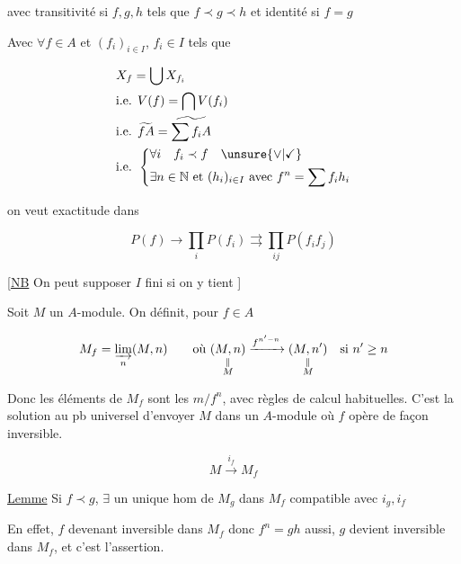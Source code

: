 avec transitivité si $f,g,h$ tels que $f\prec g\prec h$ et identité si $f=g$

Avec $\forall f\in A$ et $(f_i)_{i\in I}$, $f_i\in{I}$ tels que

\[
\begin{aligned}
&X_f=\bigcup X_{f_i}\\
&\text{i.e. }V(f)=\bigcap V(f_i)\\
&\text{i.e. }\widetilde{fA}=\widetilde{\sum f_i A}\\
&\text{i.e. }\left\{\begin{aligned}
&\forall i\quad f_i\prec f\quad\unsure{\vee|\checkmark}\\
&\exists n\in\mathbb N\text{ et }(h_i)_{i\in I}\text{ avec } f^n=\sum f_i h_i
\end{aligned}\right.
\end{aligned}
\]

on veut exactitude dans

\[
P(f)\longrightarrow\prod_i P(f_i)\rightrightarrows\prod_{ij}P(f_i f_j)
\]


[\uline{NB} On peut supposer $I$ fini si on y tient ]

Soit $M$ un $A$-module. On définit, pour $f\in A$

\[
M_f=\varinjlim_n(M,n)\qquad\text{où }\underset{\substack{\Vert\\M}}{(M,n)}
\xrightarrow{f^{n'-n}}\underset{\substack{\Vert\\M}}{(M,n')}\quad\text{si }n'\geq n
\]

Donc les éléments de $M_f$ sont les $m/f^n$, avec règles de calcul habituelles. C'est la solution au pb universel d'envoyer $M$ dans un $A$-module où $f$ opère de façon inversible.

\[
M\xrightarrow{i_f}M_f
\]

 \uline{Lemme} Si $f\prec g$, $\exists$ un unique hom de $M_g$ dans $M_f$ compatible avec $i_g,i_f$


En effet, $f$ devenant inversible dans $M_f$ donc $f^n=gh$ aussi, $g$ devient inversible dans $M_f$, et c'est  l'assertion.

